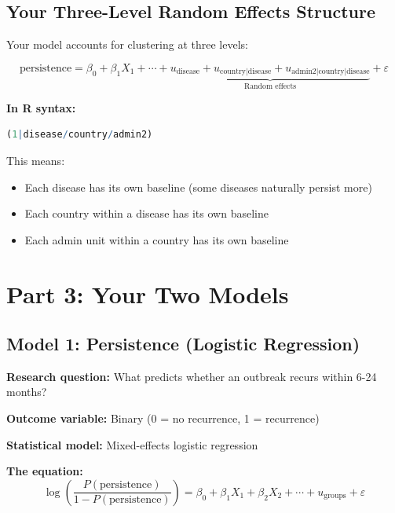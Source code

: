 \documentclass[11pt,a4paper]{article}
\begin{document}
\subsection{Your Three-Level Random Effects Structure}

Your model accounts for clustering at three levels:

\begin{equation}
\text{persistence} = \beta_0 + \beta_1 X_1 + \cdots + \underbrace{u_{\text{disease}} + u_{\text{country}|\text{disease}} + u_{\text{admin2}|\text{country}|\text{disease}}}_{\text{Random effects}} + \varepsilon
\end{equation}

\textbf{In R syntax:}
\begin{lstlisting}[language=R]
(1|disease/country/admin2)
\end{lstlisting}

This means:
\begin{itemize}
    \item Each disease has its own baseline (some diseases naturally persist more)
    \item Each country within a disease has its own baseline
    \item Each admin unit within a country has its own baseline
\end{itemize}

\section{Part 3: Your Two Models}

\subsection{Model 1: Persistence (Logistic Regression)}

\textbf{Research question:} What predicts whether an outbreak recurs within 6-24 months?

\textbf{Outcome variable:} Binary (0 = no recurrence, 1 = recurrence)

\textbf{Statistical model:} Mixed-effects logistic regression

\textbf{The equation:}
\begin{equation}
\log\left(\frac{P(\text{persistence})}{1-P(\text{persistence})}\right) = \beta_0 + \beta_1 X_1 + \beta_2 X_2 + \cdots + u_{\text{groups}} + \varepsilon
\end{equation}
\end{document}
